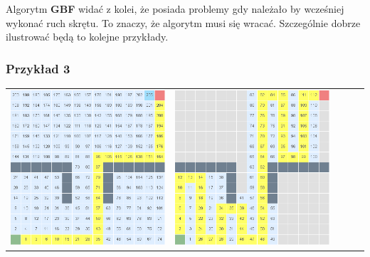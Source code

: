 \documentclass{article}
\begin{document}
Algorytm \textbf{GBF} widać z kolei, że posiada problemy gdy należało by wcześniej wykonać ruch skrętu. To znaczy, że algorytm musi się wracać. Szczególnie dobrze ilustrować będą to kolejne przykłady.\\

\subsubsection{Przykład 3}
\begin{center}
\begin{tabular}{c c c c c}
\includegraphics[scale=0.15]{images/scr10.png} &
\includegraphics[scale=0.15]{images/scr11.png} &

\end{tabular}
\end{center}
\end{document}
